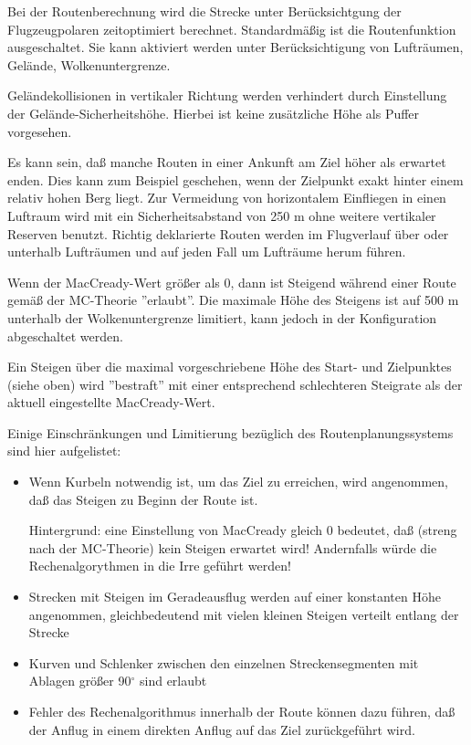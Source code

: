 Bei der Routenberechnung wird die Strecke unter Berücksichtgung der Flugzeugpolaren zeitoptimiert berechnet. Standardmäßig ist die Routenfunktion ausgeschaltet. Sie kann aktiviert werden unter   Berücksichtigung von Lufträumen, Gelände, Wolkenuntergrenze.

Geländekollisionen in vertikaler Richtung werden verhindert durch Einstellung der Gelände-Sicherheitshöhe.  Hierbei ist keine zusätzliche Höhe als Puffer vorgesehen.

Es kann sein, daß manche Routen in einer Ankunft am Ziel höher als erwartet enden. Dies kann zum Beispiel geschehen, wenn der Zielpunkt exakt hinter einem relativ hohen Berg liegt. Zur Vermeidung von horizontalem Einfliegen in einen Luftraum wird mit ein Sicherheitsabstand von 250 m ohne weitere vertikaler Reserven benutzt.
Richtig deklarierte Routen werden im Flugverlauf über oder unterhalb Lufträumen und auf jeden Fall um Lufträume herum führen.

\warning
Wenn der MacCready-Wert größer als 0, dann ist Steigend während einer Route gemäß der MC-Theorie ''erlaubt''.   Die maximale Höhe des Steigens  ist auf  500 m unterhalb der Wolkenuntergrenze limitiert, kann jedoch in der Konfiguration abgeschaltet werden.

Ein Steigen über die maximal vorgeschriebene Höhe des Start- und Zielpunktes (siehe oben) wird ''bestraft'' mit einer entsprechend schlechteren Steigrate als der aktuell eingestellte MacCready-Wert. 


Einige Einschränkungen und Limitierung bezüglich des Routenplanungssystems sind hier aufgelistet:

\begin{itemize}
\item Wenn Kurbeln notwendig ist, um das Ziel zu erreichen,  wird angenommen, daß das Steigen zu Beginn der Route ist. 

Hintergrund: eine Einstellung von  MacCready gleich 0 bedeutet, daß (streng nach der MC-Theorie) kein Steigen erwartet wird!  Andernfalls würde die Rechenalgorythmen in  die Irre geführt werden!   
\item Strecken mit Steigen im Geradeausflug werden auf einer konstanten Höhe angenommen, gleichbedeutend mit vielen kleinen Steigen verteilt entlang der Strecke
\item Kurven und Schlenker zwischen den einzelnen Streckensegmenten mit Ablagen größer 90$^\circ$ sind erlaubt
\item Fehler des Rechenalgorithmus innerhalb der Route können dazu führen, daß der Anflug in einem direkten Anflug auf das Ziel zurückgeführt wird.
\end{itemize}
